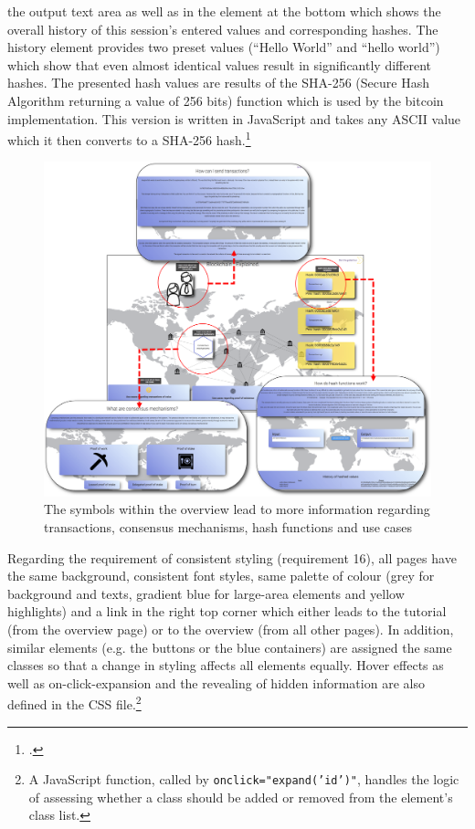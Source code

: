 the output text area as well as in the element at the bottom which shows the overall history of this session's entered values and corresponding hashes. The history element provides two preset values (\enquote{Hello World} and \enquote{hello world}) which show that even almost identical values result in significantly different hashes. The presented hash values are results of the SHA-256 (Secure Hash Algorithm returning a value of 256 bits) function which is used by the bitcoin implementation. This version is written in JavaScript and takes any ASCII value which it then converts to a SHA-256 hash.\footcite[][]{LuffJavaScriptSHA256demo2014}

\begin{figure}
    \centering
    \includegraphics[width=\textwidth]{latex-vorlage_v1.5/graphics/overview.png}
    \caption{The symbols within the overview lead to more information regarding transactions, consensus mechanisms, hash functions and use cases}
    \label{fig:AniOW}
\end{figure}

Regarding the requirement of consistent styling (requirement 16), all pages have the same background, consistent font styles, same palette of colour (grey for background and texts, gradient blue for large-area elements and yellow highlights) and a link in the right top corner which either leads to the tutorial (from the overview page) or to the overview (from all other pages). In addition, similar elements (e.g. the buttons or the blue containers) are assigned the same classes so that a change in styling affects all elements equally. Hover effects as well as on-click-expansion and the revealing of hidden information are also defined in the CSS file.\footnote{A JavaScript function, called by \texttt{onclick="expand('id')"}, handles the logic of assessing whether a class should be added or removed from the element's class list.} 


